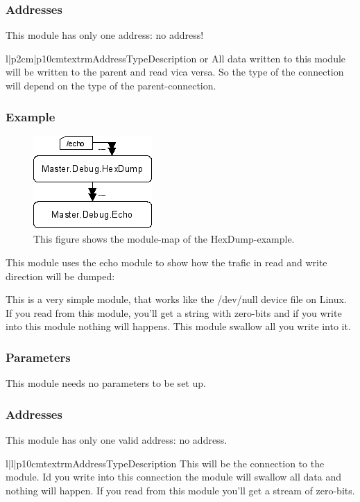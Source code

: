 \subsubsection{Addresses}
This module has only one address: no address! 
\begin{tableiii}{l|p{2cm}|p{10cm}}{textrm}{Address}{Type}{Description}
\lineiii{---}
        { or }
        {All data written to this module will be written to the parent and 
         read vica versa. So the type of the connection will depend on the
         type of the parent-connection.}
\end{tableiii}

\subsubsection{Example}
\begin{figure}[ht]
    \label{fig:coremod05.py}
    \centering
    \includegraphics{coremod05.png}
    \caption{This figure shows the module-map of the HexDump-example.}
\end{figure}    
This module uses the echo module to show how the trafic in read and write 
direction will be dumped:




%
%
This is a very simple module, that works like the /dev/null device file on 
Linux. If you read from this module, you'll get a string with zero-bits and
if you write into this module nothing will happens. This module swallow all
you write into it.

\subsubsection{Parameters}
This module needs no parameters to be set up.

\subsubsection{Addresses}
This module has only one valid address: no address.
\begin{tableiii}{l|l|p{10cm}}{textrm}{Address}{Type}{Description}
\lineiii{---}
        {}
        {This will be the connection to the  module. Id you
         write into this connection the module will swallow all data and
         nothing will happen. If you read from this module you'll get a 
         stream of zero-bits.}
\end{tableiii}


